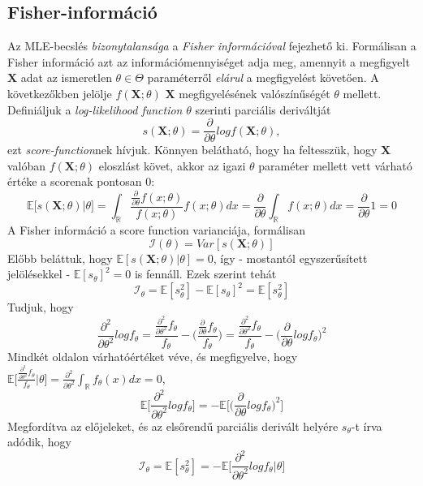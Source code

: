 \documentclass[14p]{report}
\def\pmb{\boldsymbol}
\newcounter{x}
\newcounter{y}
\newcounter{z}
\begin{document}
	\subsection{Fisher-információ}
	Az MLE-becslés \emph{bizonytalansága} a \emph{Fisher információval} fejezhető ki. Formálisan a Fisher információ azt az információmennyiséget adja meg, amennyit a megfigyelt $\pmb{X}$ adat az ismeretlen $\theta \in \Theta$ paraméterről \emph{elárul} a megfigyelést követően. A következőkben jelölje $f(\pmb{X}; \theta)$ $\pmb{X}$ megfigyelésének valószínűségét $\theta$ mellett.
	Definiáljuk a \emph{log-likelihood function} $\theta$ szerinti parciális deriváltját
	\[
		s(\pmb{X};\theta) = \frac{\partial}{\partial \theta}log f(\pmb{X};\theta),
	\]
	ezt \emph{score-function}nek hívjuk. Könnyen belátható, hogy ha feltesszük, hogy $\pmb{X}$ valóban $f(\pmb{X};\theta)$ eloszlást követ, akkor az igazi $\theta$ paraméter mellett vett várható értéke a scorenak pontosan $0$:
	\[
		\mathbb{E}\Big[ s(\pmb{X};\theta)\rvert \theta \Big] = \int_{\mathbb{R}}{\frac{\frac{\partial}{\partial \theta}f(x; \theta)}{f(x;\theta)}f(x; \theta)dx} = \frac{\partial}{\partial \theta}\int_{\mathbb{R}}{f(x; \theta)dx} = \frac{\partial}{\partial \theta} 1 = 0
	\]
	A Fisher információ a score function varianciája, formálisan
	\[
		\mathcal{I}(\theta) = Var[s(\pmb{X};\theta)]
	\]
	Előbb beláttuk, hogy $\mathbb{E}[s(\pmb{X};\theta)\rvert \theta] = 0$, így - mostantól egyszerűsített jelölésekkel - $\mathbb{E}[s_\theta]^2 = 0$ is fennáll. Ezek szerint tehát
	\[
		\mathcal{I}_\theta = \mathbb{E}[s_\theta^2] - \mathbb{E}[s_\theta]^2 = \mathbb{E}[s_\theta^2]
	\]
	Tudjuk, hogy
	\[
		\frac{\partial^2}{\partial \theta^2}log f_\theta = \frac{\frac{\partial^2}{\partial \theta^2} f_\theta}{f_\theta} - \Big( \frac{\frac{\partial}{\partial \theta}f_\theta}{f_\theta} \Big) = \frac{\frac{\partial^2}{\partial \theta^2}f_\theta}{f_\theta} - \Big(\frac{\partial}{\partial \theta} log f_\theta\Big)^2
	\]
	Mindkét oldalon várhatóértéket véve, és megfigyelve, hogy $\mathbb{E}\Big[ \frac{\frac{\partial^2}{\partial \theta^2} f_\theta}{f_\theta} \rvert \theta\Big] = \frac{\partial^2}{\partial \theta^2}\int_{\mathbb{R}}{f_\theta(x) dx} = 0$,
	\[
		\mathbb{E}\Big[ \frac{\partial^2}{\partial \theta^2} log f_\theta\Big] = -\mathbb{E}\Big[ \Big(\frac{\partial}{\partial \theta} log f_\theta \Big)^2\Big]
	\]
	Megfordítva az előjeleket, és az elsőrendű parciális derivált helyére $s_\theta$-t írva adódik, hogy
	\[
		\mathcal{I}_\theta = \mathbb{E}[s^2_\theta] = -\mathbb{E}\Big[ \frac{\partial^2}{\partial \theta^2} log f_\theta \rvert \theta \Big]
	\]
\end{document}
